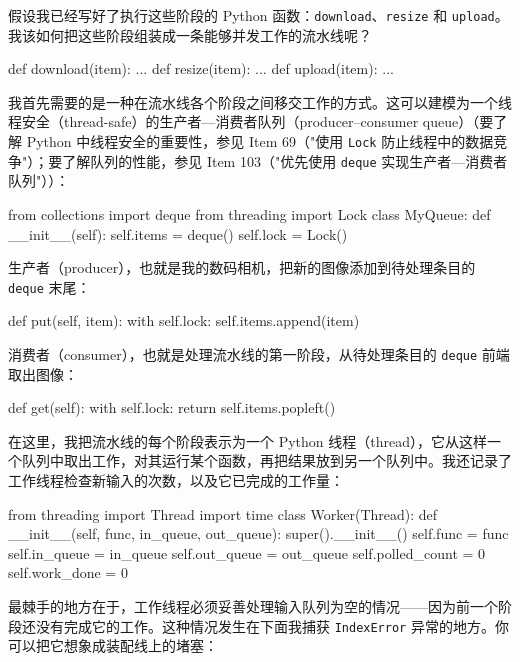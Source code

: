 假设我已经写好了执行这些阶段的 Python 函数：\texttt{download}、\texttt{resize} 和 \texttt{upload}。我该如何把这些阶段组装成一条能够并发工作的流水线呢？

\begin{codebox}[python]
def download(item):
    ...
def resize(item):
    ...
def upload(item):
    ...
\end{codebox}

我首先需要的是一种在流水线各个阶段之间移交工作的方式。这可以建模为一个线程安全（thread-safe）的生产者—消费者队列（producer–consumer queue）（要了解 Python 中线程安全的重要性，参见 Item 69（"使用 \texttt{Lock} 防止线程中的数据竞争"）；要了解队列的性能，参见 Item 103（"优先使用 \texttt{deque} 实现生产者—消费者队列"））：

\begin{codebox}[python]
from collections import deque
from threading import Lock
class MyQueue:
    def __init__(self):
        self.items = deque()
        self.lock = Lock()
\end{codebox}

生产者（producer），也就是我的数码相机，把新的图像添加到待处理条目的 \texttt{deque} 末尾：

\begin{codebox}[python]
    def put(self, item):
        with self.lock:
            self.items.append(item)
\end{codebox}

消费者（consumer），也就是处理流水线的第一阶段，从待处理条目的 \texttt{deque} 前端取出图像：

\begin{codebox}[python]
    def get(self):
        with self.lock:
            return self.items.popleft()
\end{codebox}

在这里，我把流水线的每个阶段表示为一个 Python 线程（thread），它从这样一个队列中取出工作，对其运行某个函数，再把结果放到另一个队列中。我还记录了工作线程检查新输入的次数，以及它已完成的工作量：

\begin{codebox}[python]
from threading import Thread
import time
class Worker(Thread):
    def __init__(self, func, in_queue, out_queue):
        super().__init__()
        self.func = func
        self.in_queue = in_queue
        self.out_queue = out_queue
        self.polled_count = 0
        self.work_done = 0
\end{codebox}

最棘手的地方在于，工作线程必须妥善处理输入队列为空的情况——因为前一个阶段还没有完成它的工作。这种情况发生在下面我捕获 \texttt{IndexError} 异常的地方。你可以把它想象成装配线上的堵塞：

